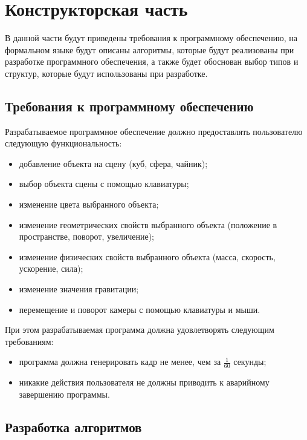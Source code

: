 \section{Конструкторская часть}


В данной части будут приведены требования к программному обеспечению, на формальном языке будут описаны алгоритмы, которые будут реализованы при разработке программного обеспечения, а также будет обоснован выбор типов и структур, которые будут использованы при разработке. %

\subsection{Требования к программному обеспечению}


Разрабатываемое программное обеспечение должно предоставлять пользователю следующую функциональность:
\begin{itemize}
    \item добавление объекта на сцену (куб, сфера, чайник);
    \item выбор объекта сцены с помощью клавиатуры;
    \item изменение цвета выбранного объекта;
    \item изменение геометрических свойств выбранного объекта (положение в пространстве, поворот, увеличение);
    \item изменение физических свойств выбранного объекта (масса, скорость, ускорение, сила);
    \item изменение значения гравитации;
    \item перемещение и поворот камеры с помощью клавиатуры и мыши.
\end{itemize}

При этом разрабатываемая программа должна удовлетворять следующим требованиям:
\begin{itemize}
    \item программа должна генерировать кадр не менее, чем за $\frac{1}{60}$ секунды;
    \item никакие действия пользователя не должны приводить к аварийному завершению программы.
\end{itemize}

\subsection{Разработка алгоритмов}

